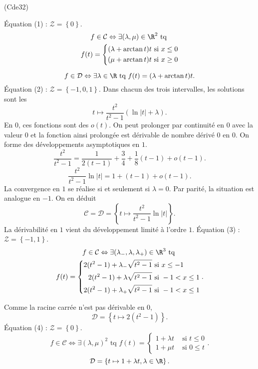 \begin{tiny}(Cde32)\end{tiny}
\'Equation (1) : $\mathcal{Z} = \left\lbrace 0 \right\rbrace$.
\begin{multline*}
  f \in \mathcal{C} \Leftrightarrow \exists (\lambda, \mu) \in \R^2 \text{ tq } \\
  f(t) =
  \left\lbrace
  \begin{aligned}
    (\lambda + \arctan t)t &\text{ si } x \leq 0 \\
    (\mu + \arctan t)t &\text{ si } x \geq 0
  \end{aligned}
  \right. 
\end{multline*}

\[
  f \in \mathcal{D} \Leftrightarrow \exists \lambda \in \R \text{ tq }
  f(t) = (\lambda + \arctan t)t.  
\]
\'Equation (2) : $\mathcal{Z} = \left\lbrace -1, 0, 1 \right\rbrace$.
Dans chacun des trois intervalles, les solutions sont les
\[
  t \mapsto \frac{t^2}{t^2 - 1}\left(\ln|t| + \lambda\right).
\]
En $0$, ces fonctions sont des $o(t)$. On peut prolonger par continuité en $0$ avec la valeur $0$ et la fonction ainsi prolongée est dérivable de nombre dérivé $0$ en $0$.\newline
On forme des développements asymptotiques en $1$.
\[
  \frac{t^2}{t^2 - 1} = \frac{1}{2(t-1)} + \frac{3}{4} + \frac{1}{8}(t-1) + o(t-1).
\]
\[
  \frac{t^2}{t^2 - 1}\ln|t| = 1 + (t-1) + o(t-1).
\]
La convergence en $1$ se réalise si et seulement si $\lambda=0$. Par parité, la situation est analogue en $-1$. On en déduit
\[
  \mathcal{C} = \mathcal{D} = \left\lbrace t \mapsto \frac{t^2}{t^2 - 1} \ln|t|\right\rbrace.
\]
La dérivabilité en $1$ vient du développement limité à l'ordre $1$.\newline
\'Equation (3) : $\mathcal{Z} = \left\lbrace -1, 1 \right\rbrace$.
\begin{multline*}
  f \in \mathcal{C} \Leftrightarrow \exists (\lambda_-, \lambda, \lambda_+) \in \R^3 \text{ tq } \\
  f(t) =
  \left\lbrace
  \begin{aligned}
    2(t^2-1)+ \lambda_-\sqrt{t^2 - 1} &\text{ si } x \leq -1 \\
    2(t^2-1)+ \lambda \sqrt{t^2 - 1} &\text{ si } -1 < x \leq 1 \\
    2(t^2-1)+ \lambda_+\sqrt{t^2 - 1} &\text{ si } -1 < x \leq 1 
  \end{aligned}
  \right. .
\end{multline*}

Comme la racine carrée n'est pas dérivable en $0$,
\[
  \mathcal{D} 
  = \left\lbrace t \mapsto 2(t^2-1)\right\rbrace.
\]
\'Equation (4) : $\mathcal{Z} = \left\lbrace 0 \right\rbrace$.
\[
  f \in \mathcal{C} \Leftrightarrow \exists (\lambda,\mu)^2 \text{ tq }
  f(t) =
  \left\lbrace
  \begin{aligned}
    1 + \lambda t &\text{ si } t \leq 0 \\
    1 + \mu t &\text{ si } 0 \leq t 
  \end{aligned}
\right. .
\]
\[
  \mathcal{D} = \left\lbrace t \mapsto 1 + \lambda t , \lambda \in \R\right\rbrace .
\]

